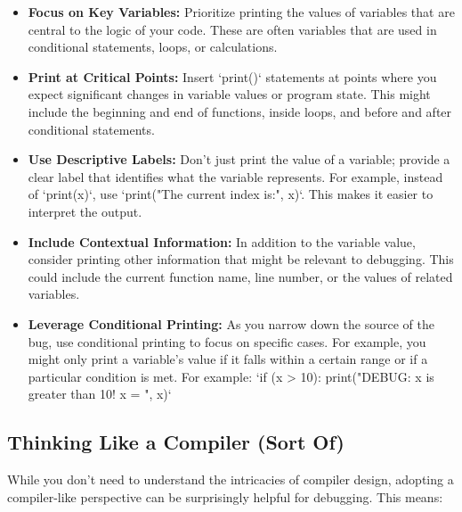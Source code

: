\documentclass{article}
\begin{document}
\begin{itemize}
    \item \textbf{Focus on Key Variables:} Prioritize printing the values of variables that are central to the logic of your code. These are often variables that are used in conditional statements, loops, or calculations.

    \item \textbf{Print at Critical Points:} Insert `print()` statements at points where you expect significant changes in variable values or program state. This might include the beginning and end of functions, inside loops, and before and after conditional statements.

    \item \textbf{Use Descriptive Labels:} Don't just print the value of a variable; provide a clear label that identifies what the variable represents. For example, instead of `print(x)`, use `print("The current index is:", x)`. This makes it easier to interpret the output.

    \item \textbf{Include Contextual Information:} In addition to the variable value, consider printing other information that might be relevant to debugging. This could include the current function name, line number, or the values of related variables.

    \item \textbf{Leverage Conditional Printing:} As you narrow down the source of the bug, use conditional printing to focus on specific cases. For example, you might only print a variable's value if it falls within a certain range or if a particular condition is met.  For example: `if (x > 10): print("DEBUG: x is greater than 10! x = ", x)`
\end{itemize}

\subsection*{Thinking Like a Compiler (Sort Of)}

While you don't need to understand the intricacies of compiler design, adopting a compiler-like perspective can be surprisingly helpful for debugging. This means:
\end{document}
